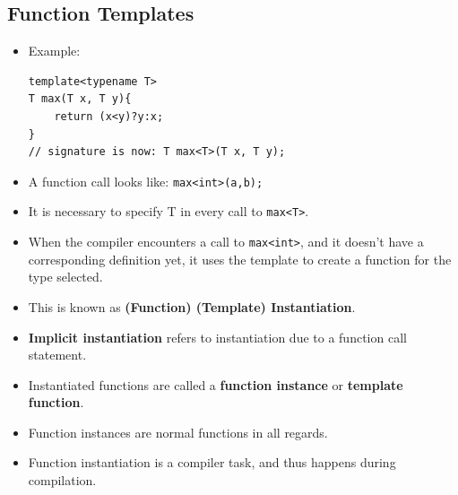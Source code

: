 \documentclass{report}
\begin{document}
\subsection{Function Templates}
\begin{itemize}
\item Example:
\begin{lstlisting}
template<typename T>
T max(T x, T y){
    return (x<y)?y:x;
}
// signature is now: T max<T>(T x, T y);
\end{lstlisting}
\item A function call looks like: \texttt{max<int>(a,b);}
\item It is necessary to specify T in every call to \texttt{max<T>}.
\item When the compiler encounters a call to \texttt{max<int>}, and it doesn't have a corresponding definition yet,
it uses the template to create a function for the type selected.
\item This is known as \textbf{(Function) (Template) Instantiation}.
\item \textbf{Implicit instantiation} refers to instantiation due to a function call statement.
\item Instantiated functions are called a \textbf{function instance} or \textbf{template function}.
\item Function instances are normal functions in all regards.
\item Function instantiation is a compiler task, and thus happens during compilation.
\end{itemize}
\end{document}
